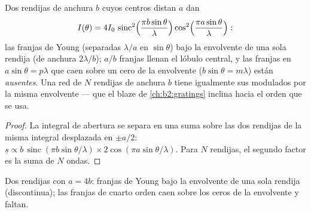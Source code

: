 \begin{proposition}\label{prop:b2:diffraction:combined}
Dos rendijas de anchura $b$ cuyos centros distan $a$ dan
\[
I(\theta) = 4I_0\,\operatorname{sinc}^2\Bigl(\frac{\pi b\sin\theta}\lambda\Bigr)\cos^2\Bigl(\frac{\pi a\sin\theta}\lambda\Bigr) :
\]
las franjas de Young (separadas $\lambda/a$ en $\sin\theta$) bajo la envolvente de una
sola rendija (de anchura $2\lambda/b$); $a/b$ franjas llenan el lóbulo central, y las
franjas en $a\sin\theta = p\lambda$ que caen sobre un cero de la envolvente
($b\sin\theta = m\lambda$) están \emph{ausentes}. Una red de $N$ rendijas de anchura
$b$ tiene igualmente sus  modulados por la misma envolvente ---
que el blaze de \cref{ch:b2:gratings} inclina hacia el orden que se usa.
\end{proposition}

\begin{proof}
La integral de abertura se separa en una suma sobre las dos rendijas de la misma
integral desplazada en $\pm a/2$: $\underline s \propto b\,\operatorname{sinc}(\pi b\sin\theta/\lambda)
\times2\cos(\pi a\sin\theta/\lambda)$. Para $N$ rendijas, el segundo factor es la
suma de $N$ ondas.
\end{proof}

\begin{omfigure}

{\small Dos rendijas con $a = 4b$: franjas de Young bajo la envolvente de una
sola rendija (discontinua); las franjas de cuarto orden caen sobre los ceros de la
envolvente y faltan.}
\end{omfigure}

